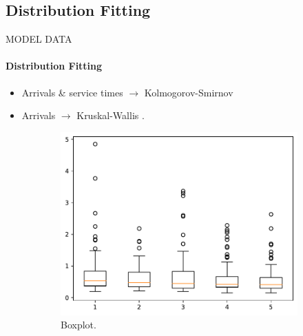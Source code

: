 \subsection{Distribution Fitting}
\begin{frame}{MODEL DATA}
    \framesubtitle{Distribution Fitting}
    \begin{itemize}
        \item Arrivals \& service times $\rightarrow$ Kolmogorov-Smirnov \citep[pp. 230-231]{banks2005discrete}
        \item Arrivals $\rightarrow$ Kruskal-Wallis \citep[pp. 765-767]{wackerly2010estadistica}.
    \end{itemize}
    \begin{figure}[H]
        \centering
        \begin{subfigure}[b]{0.475\textwidth}
            \centering
            \includegraphics[scale=0.4]{images/homogeneity-test-for-thursday-hour-7.pdf}
            \caption{Boxplot.}
            \label{subfig:boxplot}
        \end{subfigure}
        \begin{subfigure}[b]{0.475\textwidth}   
            \centering 

\end{subfigure}
\end{figure}
\end{frame}

